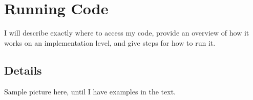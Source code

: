 \appendix
\renewcommand{\thechapter}{A}

\chapter{Running Code}

I will describe exactly where to access my code, provide an overview of how it works on an implementation level, and give steps for how to run it.

\section{Details}

Sample picture here, until I have examples in the text.



